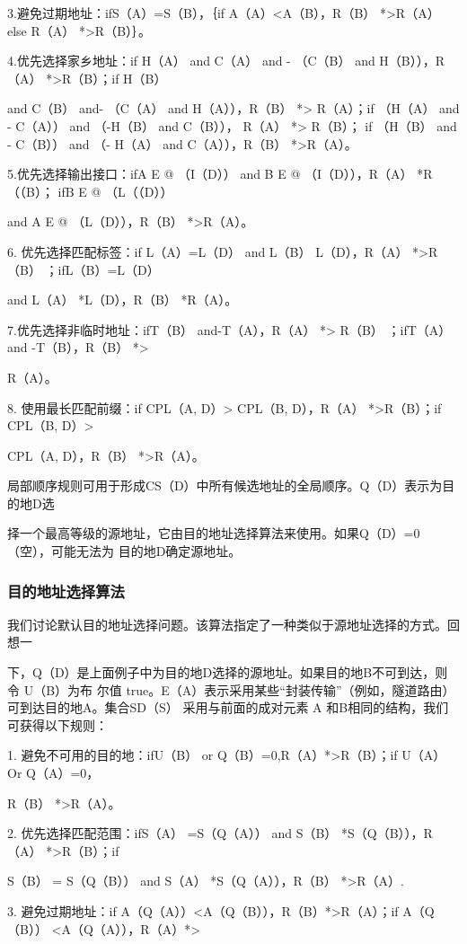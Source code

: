 3.避免过期地址：ifS（A）=S（B），｛if A（A）<A（B），R（B） *>R（A） else R（A） *>R（B）｝。

4.优先选择家乡地址：if H（A） and C（A） and - （C（B） and H（B）），R（A） *>R（B）；if H（B）

and C（B） and- （C（A） and H（A）），R（B） *> R（A）；if （H（A） and - C（A）） and （-H（B） and C（B）），
R（A） *> R（B）； if （H（B） and - C（B）） and （- H（A） and C（A）），R（B） *>R（A）。

5.优先选择输出接口：ifA E @ （I（D）） and B E @ （I（D）），R（A） *R（（B）； ifB E @ （L（（D））

and A E @ （L（D）），R（B） *>R（A）。

6. 优先选择匹配标签：if L（A）=L（D） and L（B） L（D），R（A） *>R（B） ；ifL（B）=L（D）

and L（A） *L（D），R（B） *R（A）。

7.优先选择非临时地址：ifT（B） and-T（A），R（A） *> R（B） ；ifT（A） and -T（B），R（B） *>

R（A）。

8. 使用最长匹配前缀：if CPL（A, D）> CPL（B, D），R（A） *>R（B）；if CPL（B, D）>

CPL（A, D），R（B） *>R（A）。

局部顺序规则可用于形成CS（D）中所有候选地址的全局顺序。Q（D）表示为目的地D选

择一个最高等级的源地址，它由目的地址选择算法来使用。如果Q（D）=0（空），可能无法为
目的地D确定源地址。

\subsubsection{目的地址选择算法}
我们讨论默认目的地址选择问题。该算法指定了一种类似于源地址选择的方式。回想一

下，Q（D）是上面例子中为目的地D选择的源地址。如果目的地B不可到达，则令 U（B）为布
尔值 true。E（A）表示采用某些“封装传输”（例如，隧道路由）可到达目的地A。集合SD（S）
采用与前面的成对元素 A 和B相同的结构，我们可获得以下规则：

1. 避免不可用的目的地：ifU（B） or Q（B）=0,R（A）*>R（B）；if U（A） Or Q（A）=0，

R（B） *>R（A）。

2. 优先选择匹配范围：ifS（A） =S（Q（A）） and S（B） *S（Q（B）），R（A） *>R（B）；if

S（B） = S（Q（B）） and S（A） *S（Q（A）），R（B） *>R（A）.

3. 避免过期地址：if A（Q（A））<A（Q（B）），R（B）*>R（A）；if A（Q（B）） <A（Q（A）），R（A）*>

